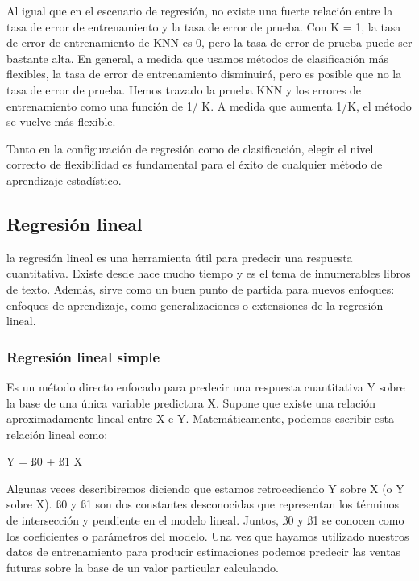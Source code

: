 \documentclass[
  letterpaper,
  DIV=11,
  numbers=noendperiod]{scrartcl}
\begin{document}
Al igual que en el escenario de regresión, no existe una fuerte relación
entre la tasa de error de entrenamiento y la tasa de error de prueba.
Con K = 1, la tasa de error de entrenamiento de KNN es 0, pero la tasa
de error de prueba puede ser bastante alta. En general, a medida que
usamos métodos de clasificación más flexibles, la tasa de error de
entrenamiento disminuirá, pero es posible que no la tasa de error de
prueba. Hemos trazado la prueba KNN y los errores de entrenamiento como
una función de 1/ K. A medida que aumenta 1/K, el método se vuelve más
flexible.

Tanto en la configuración de regresión como de clasificación, elegir el
nivel correcto de flexibilidad es fundamental para el éxito de cualquier
método de aprendizaje estadístico.

\hypertarget{regresiuxf3n-lineal}{%
\subsection{\texorpdfstring{\textbf{Regresión
lineal}}{Regresión lineal}}\label{regresiuxf3n-lineal}}

la regresión lineal es una herramienta útil para predecir una respuesta
cuantitativa. Existe desde hace mucho tiempo y es el tema de
innumerables libros de texto. Además, sirve como un buen punto de
partida para nuevos enfoques: enfoques de aprendizaje, como
generalizaciones o extensiones de la regresión lineal.

\hypertarget{regresiuxf3n-lineal-simple}{%
\subsubsection{\texorpdfstring{\textbf{Regresión lineal
simple}}{Regresión lineal simple}}\label{regresiuxf3n-lineal-simple}}

Es un método directo enfocado para predecir una respuesta cuantitativa Y
sobre la base de una única variable predictora X. Supone que existe una
relación aproximadamente lineal entre X e Y. Matemáticamente, podemos
escribir esta relación lineal como:

Y = ß0 + ß1 X

Algunas veces describiremos diciendo que estamos retrocediendo Y sobre X
(o Y sobre X). ß0 y ß1 son dos constantes desconocidas que representan
los términos de intersección y pendiente en el modelo lineal. Juntos, ß0
y ß1 se conocen como los coeficientes o parámetros del modelo. Una vez
que hayamos utilizado nuestros datos de entrenamiento para producir
estimaciones podemos predecir las ventas futuras sobre la base de un
valor particular calculando.
\end{document}
